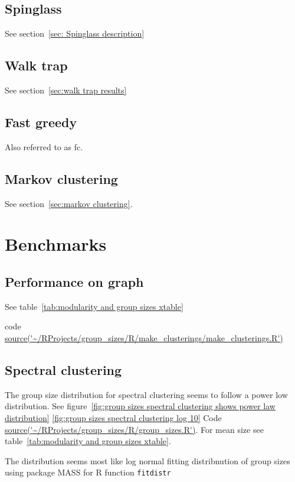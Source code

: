 \cite{blondel2008fast}

\subsection{Spinglass}
See section~\ref{sec: Spinglass description}

\subsection{Walk trap}
See section~\ref{sec:walk trap results}

\cite{pons2005computing}
\subsection{Fast greedy}
Also referred to as fc.
\cite{clauset2004finding}


\subsection{Markov clustering}
See section~\ref{sec:markov clustering}.




\section{Benchmarks}

\subsection{Performance on graph}
See table~\ref{tab:modularity and group sizes xtable} 

code \url{source('~/RProjects/group_sizes/R/make_clusterings/make_clusterings.R')}

\subsection{Spectral clustering}

The group size distribution for spectral clustering seems to follow a power low distribution. See figure~\ref{fig:group sizes spectral clustering shows power law distribution} \ref{fig:group sizes spectral clustering log 10} Code \url{source('~/RProjects/group_sizes/R/group_sizes.R')}. For mean size see table~\ref{tab:modularity and group sizes xtable}. 

The distribution seems most like log normal fitting distribnution of group sizes using package MASS for R function \texttt{fitdistr}

